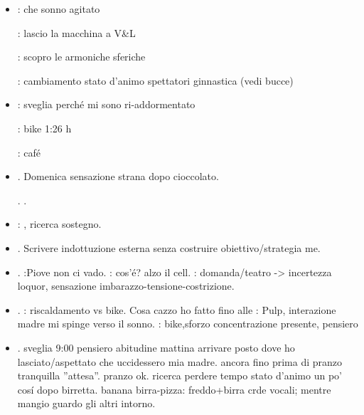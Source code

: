 \begin{itemize}
\item {}

: che sonno agitato

: lascio la macchina a V\&L

: scopro le armoniche sferiche

: cambiamento stato d'animo spettatori ginnastica (vedi bucce)

\item {}

: sveglia perch\'e mi sono ri-addormentato

: bike 1:26 h

: caf\'e

\item {}.
Domenica sensazione strana dopo cioccolato.

. .

\item {}: , ricerca sostegno.

\item {}. Scrivere indottuzione esterna senza costruire obiettivo/strategia me.

\item {}. :Piove non ci vado. : cos'\'e? alzo il cell. : domanda/teatro -> incertezza loquor, sensazione imbarazzo-tensione-costrizione.

\item {}. : riscaldamento vs bike. Cosa cazzo ho fatto fino alle : Pulp, interazione madre mi spinge verso il sonno. : bike,sforzo concentrazione presente, pensiero 

\item {}. sveglia 9:00 pensiero abitudine mattina arrivare posto dove ho lasciato/aspettato che uccidessero mia madre. ancora fino prima di pranzo tranquilla ''attesa''. pranzo ok. ricerca perdere tempo stato d'animo un po' cos\'i dopo birretta. banana birra-pizza: freddo+birra crde vocali; mentre mangio guardo gli altri intorno.


\end{itemize}
